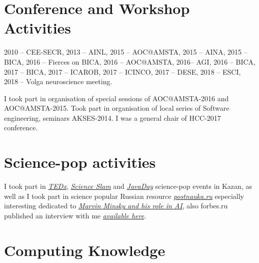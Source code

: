 \documentclass{moderncv}
\begin{document}
\cvitem{}{}

\section{Conference and Workshop Activities}

2010 -- CEE-SECR, 2013 -- AINL, 2015 -- AOC@AMSTA, 2015 -- AINA, 2015 -- BICA, 2016 -- Fierces on BICA, 2016 -- AOC@AMSTA, 2016-- AGI, 2016 -- BICA, 2017 -- BICA, 2017 -- ICAROB, 2017 -- ICINCO, 2017 -- DESE, 2018 -- ESCI, 2018 -- Volga neuroscience meeting.

I took part in organisation of special sessions of AOC@AMSTA-2016 and AOC@AMSTA-2015. Took part in organisation of local series of Software engineering, seminars AKSES-2014. I was a general chair of HCC-2017 conference.

\section{Science-pop activities}

I took part in \href{https://www.youtube.com/watch?v=BLvS7h3kRbo}{\emph{TEDx}}, \href{https://vk.com/video-87488544_171504962}{\emph{Science Slam}} and \href{https://www.youtube.com/watch?v=sLLKxvUEA7E}{\emph{JavaDay}} science-pop events in Kazan, as well as I took part in science popular Russian resource \href{https://postnauka.ru/author/talanov}{\emph{postnauka.ru}} especially interesting dedicated to \href{https://postnauka.ru/faq/58727}{\emph{Marvin Minsky and his role in AI}}, also forbes.ru published an interview with me \href{http://www.forbes.ru/mneniya-column/288097-kak-sozdat-emotsionalnyi-iskusstvennyi-intellekt}{\emph{available here}}.

\section{Computing Knowledge}

\end{document}
